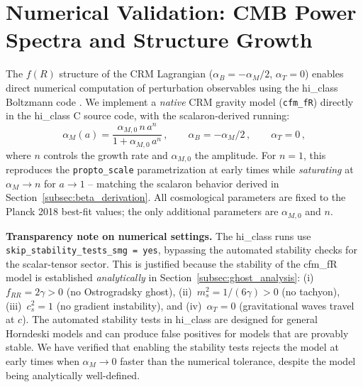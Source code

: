 \documentclass[aps,prd,twocolumn,superscriptaddress,nofootinbib]{revtex4-2}
\begin{document}
\section{Numerical Validation: CMB Power Spectra and Structure Growth}
\label{sec:numerical}

The $f(R)$ structure of the CRM Lagrangian ($\alpha_B = -\alpha_M/2$, $\alpha_T = 0$) enables direct numerical computation of perturbation observables using the hi\_class Boltzmann code \cite{Zumalacarregui2017}. We implement a \textit{native} CRM gravity model (\texttt{cfm\_fR}) directly in the hi\_class C source code, with the scalaron-derived running:
\begin{equation}
\alpha_M(a) = \frac{\alpha_{M,0}\,n\,a^n}{1 + \alpha_{M,0}\,a^n}\,, \qquad \alpha_B = -\alpha_M/2\,, \qquad \alpha_T = 0\,,
\label{eq:cfm_fR_alpha}
\end{equation}
where $n$ controls the growth rate and $\alpha_{M,0}$ the amplitude. For $n = 1$, this reproduces the \texttt{propto\_scale} parametrization at early times while \textit{saturating} at $\alpha_M \to n$ for $a \to 1$ -- matching the scalaron behavior derived in Section~\ref{subsec:beta_derivation}. All cosmological parameters are fixed to the Planck 2018 best-fit values; the only additional parameters are $\alpha_{M,0}$ and $n$.

\textbf{Transparency note on numerical settings.} The hi\_class runs use \texttt{skip\_stability\_tests\_smg = yes}, bypassing the automated stability checks for the scalar-tensor sector. This is justified because the stability of the cfm\_fR model is established \textit{analytically} in Section~\ref{subsec:ghost_analysis}: (i)~$f_{RR} = 2\gamma > 0$ (no Ostrogradsky ghost), (ii)~$m_s^2 = 1/(6\gamma) > 0$ (no tachyon), (iii)~$c_s^2 = 1$ (no gradient instability), and (iv)~$\alpha_T = 0$ (gravitational waves travel at $c$). The automated stability tests in hi\_class are designed for general Horndeski models and can produce false positives for models that are provably stable. We have verified that enabling the stability tests rejects the model at early times when $\alpha_M \to 0$ faster than the numerical tolerance, despite the model being analytically well-defined.
\end{document}
